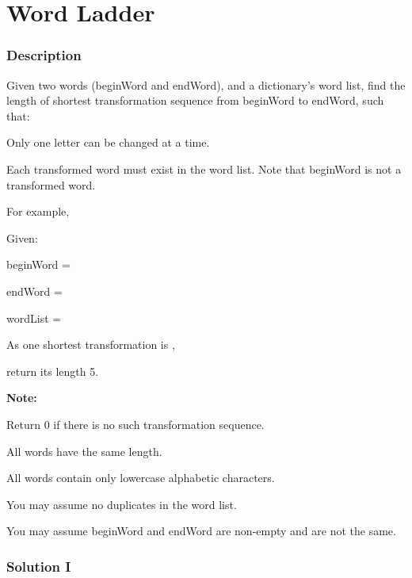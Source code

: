 \newpage

\section{Word Ladder} %

\subsubsection{Description}

Given two words (beginWord and endWord), and a dictionary's word list, find the length of shortest transformation sequence from beginWord to endWord, such that:

Only one letter can be changed at a time.

Each transformed word must exist in the word list. Note that beginWord is not a transformed word.

For example,

Given:

beginWord = 

endWord = 

wordList = 

As one shortest transformation is ,

return its length 5.

\textbf{Note:}

Return 0 if there is no such transformation sequence.

All words have the same length.

All words contain only lowercase alphabetic characters.

You may assume no duplicates in the word list.

You may assume beginWord and endWord are non-empty and are not the same.

\newpage

\subsubsection{Solution I}

